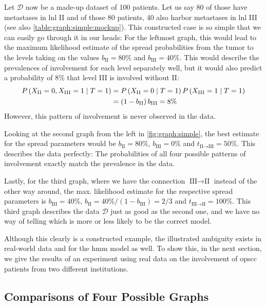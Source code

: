 \documentclass[\relativeRoot/main.tex]{subfiles}
\begin{document}
Let $\boldsymbol{\mathcal{D}}$ now be a made-up dataset of 100 patients. Let us say 80 of those have metastases in \gls{lnl} II and of those 80 patients, 40 also harbor metastases in \gls{lnl} III (see also \cref{table:graph:simple:mockup}). This constructed case is so simple that we can easily go through it in our heads: For the leftmost graph, this would lead to the maximum likelihood estimate of the spread probabilities from the tumor to the levels taking on the values $b_\text{II} = 80\%$ and $b_\text{III} = 40\%$. This would describe the prevalences of involvement for each level separately well, but it would also predict a probability of 8\% that level III is involved without II:
%
\begin{equation}
    \begin{aligned}
        P \left( X_\text{II}=0, X_\text{III}=1 \mid T=1 \right) &= P \left( X_\text{II}=0 \mid T=1 \right) P \left( X_\text{III}=1 \mid T=1 \right) \\
        &= \left( 1 - b_\text{II} \right) b_\text{III} = 8\%
    \end{aligned}
\end{equation}
%
However, this pattern of involvement is never observed in the data.

Looking at the second graph from the left in \cref{fig:graph:simple}, the best estimate for the spread parameters would be $b_\text{II} = 80\%$, $b_\text{III} = 0\%$ and $t_{\text{II} \rightarrow \text{III}} = 50\%$. This describes the data perfectly: The probabilities of all four possible patterns of involvement exactly match the prevalence in the data.

Lastly, for the third graph, where we have the connection $\text{III} \rightarrow \text{II}$ instead of the other way around, the max. likelihood estimate for the respective spread parameters is $b_\text{III} = 40\%$, $b_\text{II} = 40\% / (1 - b_\text{III}) = 2/3$ and $t_{\text{III} \rightarrow \text{II}} = 100\%$. This third graph describes the data $\boldsymbol{\mathcal{D}}$ just as good as the second one, and we have no way of telling which is more or less likely to be the correct model.

Although this clearly is a constructed example, the illustrated ambiguity exists in real-world data and for the \gls{hmm} model as well. To show this, in the next section, we give the results of an experiment using real data on the involvement of \gls{opscc} patients from two different institutions.

\subsection{Comparisons of Four Possible Graphs}
\label{subsec:graph:simple:comp}
\end{document}
